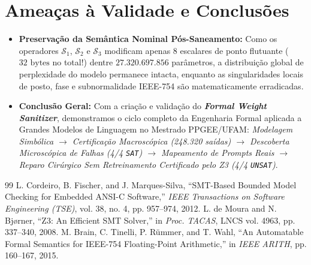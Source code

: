 \documentclass[11pt,a4paper]{article}
\theoremstyle{definition}
\begin{document}
\section{Ameaças à Validade e Conclusões}

\begin{itemize}
    \item \textbf{Preservação da Semântica Nominal Pós-Saneamento:} Como os operadores $\mathcal{S}_1$, $\mathcal{S}_2$ e $\mathcal{S}_3$ modificam apenas 8 escalares de ponto flutuante ($32\text{ bytes}$ no total!) dentre $27.320.697.856$ parâmetros, a distribuição global de perplexidade do modelo permanece intacta, enquanto as singularidades locais de posto, fase e subnormalidade IEEE-754 são matematicamente erradicadas.
    \item \textbf{Conclusão Geral:} Com a criação e validação do \textbf{\textit{Formal Weight Sanitizer}}, demonstramos o ciclo completo da Engenharia Formal aplicada a Grandes Modelos de Linguagem no Mestrado PPGEE/UFAM: \textit{Modelagem Simbólica $\to$ Certificação Macroscópica (248.320 saídas) $\to$ Descoberta Microscópica de Falhas (4/4 \texttt{SAT}) $\to$ Mapeamento de Prompts Reais $\to$ Reparo Cirúrgico Sem Retreinamento Certificado pelo Z3 (4/4 \texttt{UNSAT})}.
\end{itemize}

\vspace{0.4cm}
\begin{thebibliography}{99}
\footnotesize
{} L. Cordeiro, B. Fischer, and J. Marques-Silva, ``SMT-Based Bounded Model Checking for Embedded ANSI-C Software,'' \textit{IEEE Transactions on Software Engineering (TSE)}, vol. 38, no. 4, pp. 957--974, 2012.
 L. de Moura and N. Bj{\o}rner, ``Z3: An Efficient SMT Solver,'' in \textit{Proc. TACAS}, LNCS vol. 4963, pp. 337--340, 2008.
 M. Brain, C. Tinelli, P. R{\"u}mmer, and T. Wahl, ``An Automatable Formal Semantics for IEEE-754 Floating-Point Arithmetic,'' in \textit{IEEE ARITH}, pp. 160--167, 2015.
\end{thebibliography}
\end{document}
